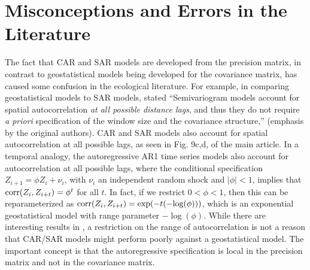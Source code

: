 \documentclass[11pt, titlepage]{article}\usepackage[]{graphicx}\usepackage[]{color}
\begin{document}

\clearpage
\setcounter{equation}{0}
\renewcommand{\theequation}{S\arabic{equation}}
\setcounter{figure}{0}
\renewcommand{\thefigure}{S\arabic{figure}}
\section*{Misconceptions and Errors in the Literature}

The fact that CAR and SAR models are developed from the precision matrix, in contrast to geostatistical models being developed for the covariance matrix, has caused some confusion in the ecological literature.  For example, in comparing geostatistical models to SAR models, \citet{Begu:Puey:comp:2009} stated ``Semivariogram models account for spatial autocorrelation \emph{at all possible distance lags}, and thus they do not require \emph{a priori} specification of the window size and the covariance structure,'' (emphasis by the original authors).  CAR and SAR models also account for spatial autocorrelation at all possible lags, as seen in Fig. 9c,d, of the main article.  In a temporal analogy, the autoregressive AR1 time series models also account for autocorrelation at all possible lags, where the conditional specification $Z_{i+1} = \phi Z_i + \nu_i$, with $\nu_i$ an independent random shock and $|\phi| < 1$, implies that $\textrm{corr}(Z_{i},Z_{i+t}) = \phi^t$ for all $t$.  In fact, if we restrict $0 < \phi < 1$, then this can be reparameterized as $\textrm{corr}(Z_{i},Z_{i+t}) = \exp(-t(-\textrm{log}(\phi)))$, which is an exponential geostatistical model with range parameter $-\log(\phi)$.  While there are interesting results in \citet{Begu:Puey:comp:2009}, a restriction on the range of autocorrelation is not a reason that CAR/SAR models might perform poorly against a geostatistical model.  The important concept is that the autoregressive specification is local in the precision matrix and not in the covariance matrix.
\end{document}
